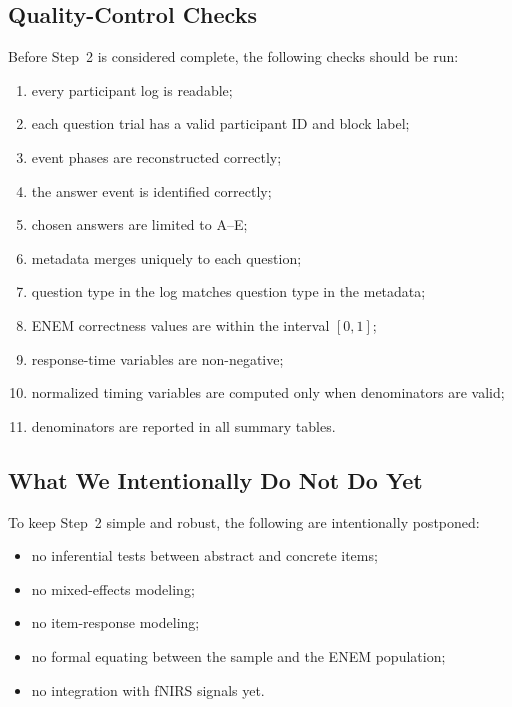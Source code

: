 \documentclass[11pt]{article}
\begin{document}
\subsection{Quality-Control Checks}
Before Step~2 is considered complete, the following checks should be run:
\begin{enumerate}
    \item every participant log is readable;
    \item each question trial has a valid participant ID and block label;
    \item event phases are reconstructed correctly;
    \item the answer event is identified correctly;
    \item chosen answers are limited to A--E;
    \item metadata merges uniquely to each question;
    \item question type in the log matches question type in the metadata;
    \item ENEM correctness values are within the interval $[0,1]$;
    \item response-time variables are non-negative;
    \item normalized timing variables are computed only when denominators are valid;
    \item denominators are reported in all summary tables.
\end{enumerate}

\subsection{What We Intentionally Do Not Do Yet}
To keep Step~2 simple and robust, the following are intentionally postponed:
\begin{itemize}
    \item no inferential tests between abstract and concrete items;
    \item no mixed-effects modeling;
    \item no item-response modeling;
    \item no formal equating between the sample and the ENEM population;
    \item no integration with fNIRS signals yet.
\end{itemize}
\end{document}
